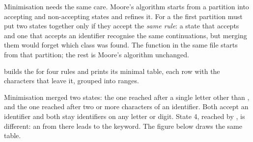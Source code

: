 Minimisation needs the same care. Moore's algorithm starts from a partition into accepting and non-accepting states and refines it. For a  the first partition must put two states together only if they accept the \emph{same rule}: a state that accepts  and one that accepts an identifier recognise the same continuations, but merging them would forget which class was found. The function  in the same file starts from that partition; the rest is Moore's algorithm unchanged.

 builds the  for four rules and prints its minimal table, each row with the characters that leave it, grouped into ranges.

\label{lst:b3:lexical-analysis:table}
\label{out:b3:lexical-analysis:table}

Minimisation merged two states: the one reached after a single letter other than , and the one reached after two or more characters of an identifier. Both accept an identifier and both stay identifiers on any letter or digit. State 4, reached by , is different: an  from there leads to the keyword. The figure below draws the same table.

